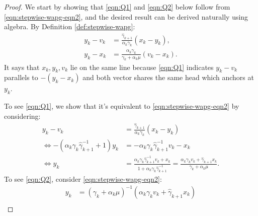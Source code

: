 \documentclass[12pt]{article}
\begin{document}
    \begin{proof}
        We start by showing that \eqref{eqn:Q1} and \eqref{eqn:Q2} below 
        follow from \eqref{eqn:stepwise-wapg-eqn2}, and the desired result can be derived naturally using algebra.
        By Definition \ref{def:stepwise-wapg}:
        \begin{align*}
            y_k - v_k &=
            \frac{\hat \gamma_{k + 1}}{\alpha_k \gamma_k}(x_k - y_k),
            \tag{Q1}\label{eqn:Q1}
            \\
            y_k - x_k &=
            \frac{\alpha_k \gamma_k}{\gamma_k + \alpha_k \mu}(v_k - x_k).
            \tag{Q2}\label{eqn:Q2}
        \end{align*}
        It says that $x_k, y_k, v_k$ lie on the same line because \eqref{eqn:Q1} indicates $y_k - v_k$ parallels to $-(y_k - x_k)$ and both vector shares the same head which anchors at $y_k$.
        \par
        To see \eqref{eqn:Q1}, we show that it's equivalent to \eqref{eqn:stepwise-wapg-eqn2} by considering:
        \begin{align*}
            y_k - v_k &=
            \frac{\hat \gamma_{k + 1}}{\alpha_k \gamma_k}(x_k - y_k)
            \\
            \iff
            -(\alpha_k \gamma_k \hat \gamma^{-1}_{k + 1} + 1)y_k
            &=
            - \alpha_k \gamma_k \hat \gamma^{-1}_{k + 1}v_k - x_k
            \\
            \iff
            y_k &=
            \frac{
                \alpha_k \gamma_k \hat \gamma_{k + 1}^{-1}v_k + x_k
            }{1 + \alpha_k \gamma_k \hat \gamma_{k + 1}^{-1}}
            =
            \frac{\alpha_k \gamma_k v_k + \hat \gamma_{k + 1} x_k}{\gamma_k + \alpha_k \mu}.
        \end{align*}
        To see \eqref{eqn:Q2}, consider \eqref{eqn:stepwise-wapg-eqn2}:
        \begin{align*}
            y_k &= (\gamma_k + \alpha_k \mu)^{-1}(\alpha_k \gamma_k v_k + \hat\gamma_{k + 1} x_k)
            \\

\end{align*}
\end{proof}
\end{document}
